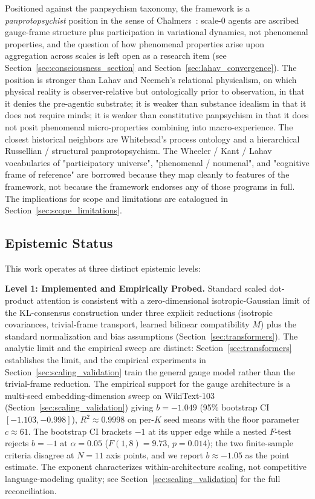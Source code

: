 \documentclass[11pt]{article}
\begin{document}
Positioned against the panpsychism taxonomy, the framework is a \emph{panprotopsychist} position in the sense of Chalmers~\cite{Chalmers2013consciousness, Chalmers2016}: scale-0 agents are ascribed gauge-frame structure plus participation in variational dynamics, not phenomenal properties, and the question of how phenomenal properties arise upon aggregation across scales is left open as a research item (see Section~\ref{sec:consciousness_section} and Section~\ref{sec:lahav_convergence}). The position is stronger than Lahav and Neemeh's relational physicalism, on which physical reality is observer-relative but ontologically prior to observation, in that it denies the pre-agentic substrate; it is weaker than substance idealism in that it does not require minds; it is weaker than constitutive panpsychism in that it does not posit phenomenal micro-properties combining into macro-experience. The closest historical neighbors are Whitehead's process ontology and a hierarchical Russellian / structural panprotopsychism. The Wheeler / Kant / Lahav vocabularies of "participatory universe", "phenomenal / noumenal", and "cognitive frame of reference" are borrowed because they map cleanly to features of the framework, not because the framework endorses any of those programs in full. The implications for scope and limitations are catalogued in Section~\ref{sec:scope_limitations}.

\subsection{Epistemic Status}

This work operates at three distinct epistemic levels:

\textbf{Level 1: Implemented and Empirically Probed.} Standard scaled dot-product attention is consistent with a zero-dimensional isotropic-Gaussian limit of the KL-consensus construction under three explicit reductions (isotropic covariances, trivial-frame transport, learned bilinear compatibility $M$) plus the standard normalization and bias assumptions (Section~\ref{sec:transformers}). The analytic limit and the empirical sweep are distinct: Section~\ref{sec:transformers} establishes the limit, and the empirical experiments in Section~\ref{sec:scaling_validation} train the general gauge model rather than the trivial-frame reduction. The empirical support for the gauge architecture is a multi-seed embedding-dimension sweep on WikiText-103 (Section~\ref{sec:scaling_validation}) giving $b = -1.049$ (95\% bootstrap CI $[-1.103, -0.998]$), $R^2 \approx 0.9998$ on per-$K$ seed means with the floor parameter $c \approx 61$. The bootstrap CI brackets $-1$ at its upper edge while a nested $F$-test rejects $b = -1$ at $\alpha = 0.05$ ($F(1,8) = 9.73$, $p = 0.014$); the two finite-sample criteria disagree at $N = 11$ axis points, and we report $b \approx -1.05$ as the point estimate. The exponent characterizes within-architecture scaling, not competitive language-modeling quality; see Section~\ref{sec:scaling_validation} for the full reconciliation.
\end{document}
